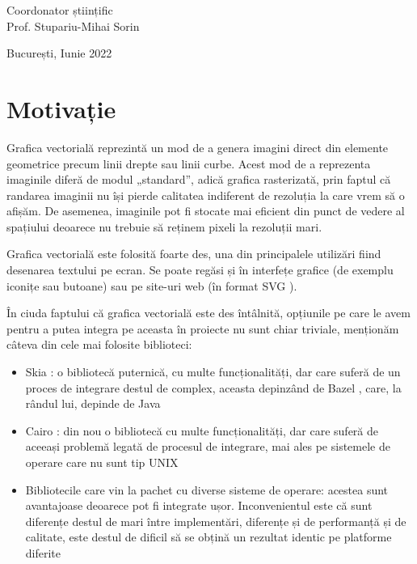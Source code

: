 \documentclass[a4paper, 12pt]{report}
\begin{document}
\begin{titlepage}
    \vspace{0.25cm}

    \begin{center}
        \large Coordonator științific \\ Prof. Stupariu-Mihai Sorin
    \end{center}

    \vspace{2cm}

    \begin{center}
        \Large București, Iunie 2022
    \end{center}
\end{titlepage}
\makeatother

\tableofcontents

\chapter{Motivație}

Grafica vectorială \cite{vector_graphics_wikipedia} reprezintă un mod de a genera imagini
direct din elemente geometrice precum linii drepte sau linii curbe. Acest mod de a reprezenta
imaginile diferă de modul „standard”, adică grafica rasterizată, prin faptul că randarea imaginii
nu își pierde calitatea indiferent de rezoluția la care vrem să o afișăm. De asemenea, imaginile
pot fi stocate mai eficient din punct de vedere al spațiului deoarece nu trebuie să reținem pixeli
la rezoluții mari.

Grafica vectorială este folosită foarte des, una din principalele utilizări fiind desenarea textului
pe ecran. Se poate regăsi și în interfețe grafice (de exemplu iconițe sau butoane) sau pe site-uri
web (în format SVG \cite{svg_standard}).

În ciuda faptului că grafica vectorială este des întâlnită, opțiunile pe care le avem pentru a putea
integra pe aceasta în proiecte nu sunt chiar triviale, menționăm câteva din cele mai folosite biblioteci:
\begin{itemize}
    \item{Skia \cite{skia_library}: o bibliotecă puternică, cu multe funcționalități, dar care suferă
                de un proces de integrare destul de complex, aceasta depinzând de Bazel \cite{bazel_build_system},
                care, la rândul lui, depinde de Java \cite{java_programming_language}}
    \item{Cairo \cite{cairo_library}: din nou o bibliotecă cu multe funcționalități, dar care suferă de aceeași
                problemă legată de procesul de integrare, mai ales pe sistemele de operare care nu sunt tip UNIX \cite{unix}}
    \item{Bibliotecile care vin la pachet cu diverse sisteme de operare: acestea sunt avantajoase deoarece pot fi
                integrate ușor. Inconvenientul este că sunt diferențe destul de mari între implementări, diferențe și de
                performanță și de calitate, este destul de dificil să se obțină un rezultat identic pe platforme diferite}
\end{itemize}
\end{document}
